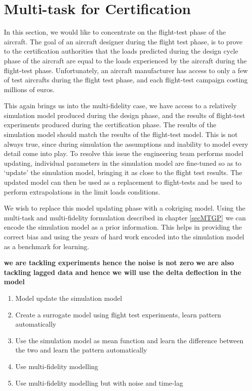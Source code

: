 \section{Multi-task for Certification}\label{subsecMTGPExtrapolation}
In this section, we would like to concentrate on the flight-test phase of the aircraft. The goal of an aircraft designer during the flight test phase, is to prove to the certification authorities that the loads predicted during the design cycle phase of the aircraft are equal to the loads experienced by the aircraft during the flight-test phase. Unfortunately, an aircraft manufacturer has access to only a few of test aircrafts during the flight test phase, and each flight-test campaign costing millions of euros. 

This again brings us into the multi-fidelity case, we have access to a relatively simulation model produced during the design phase, and the results of flight-test experiments produced during the certification phase. The results of the simulation model should match the results of the flight-test model. This is not always true, since during simulation the assumptions and inability to model every detail come into play. To resolve this issue the engineering team performs model updating, individual parameters in the simulation model are fine-tuned so as to `update' the simulation model, bringing it as close to the flight test results. The updated model can then be used as a replacement to flight-tests and be used to perform extrapolations in the limit loads conditions.

We wish to replace this model updating phase with a cokriging model. Using the multi-task and multi-fidelity formulation described in chapter \ref{secMTGP} we can encode the simulation model as a prior information. This helps in providing the correct bias and using the years of hard work encoded into the simulation model as a benchmark for learning. 

\textbf{we are tackling experiments hence the noise is not zero}
\textbf{we are also tackling lagged data and hence we will use the delta deflection in the model}

\begin{enumerate}
\item Model update the simulation model
\item Create a surrogate model using flight test experiments, learn pattern automatically
\item Use the simulation model as mean function and learn the difference between the two and learn the pattern automatically
\item Use multi-fidelity modelling 
\item Use multi-fidelity modelling but with noise and time-lag
\end{enumerate}

